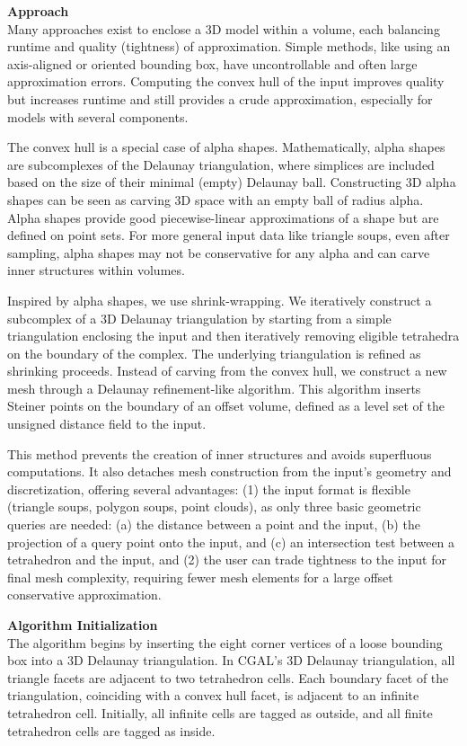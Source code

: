 \documentclass[12pt]{article}
\begin{document}
\textbf{Approach}\\
Many approaches exist to enclose a 3D model within a volume, each balancing runtime
and quality (tightness) of approximation. Simple methods, like using an axis-aligned
or oriented bounding box, have uncontrollable and often large approximation errors.
Computing the convex hull of the input improves quality but increases runtime and
still provides a crude approximation, especially for models with several components.

The convex hull is a special case of alpha shapes. Mathematically, alpha shapes are
subcomplexes of the Delaunay triangulation, where simplices are included based on the
size of their minimal (empty) Delaunay ball. Constructing 3D alpha shapes can be seen
as carving 3D space with an empty ball of radius alpha. Alpha shapes provide good
piecewise-linear approximations of a shape but are defined on point sets. For more
general input data like triangle soups, even after sampling, alpha shapes may not be
conservative for any alpha and can carve inner structures within volumes.

Inspired by alpha shapes, we use shrink-wrapping. We iteratively construct a subcomplex
of a 3D Delaunay triangulation by starting from a simple triangulation enclosing the
input and then iteratively removing eligible tetrahedra on the boundary of the complex.
The underlying triangulation is refined as shrinking proceeds. Instead of carving from
the convex hull, we construct a new mesh through a Delaunay refinement-like algorithm.
This algorithm inserts Steiner points on the boundary of an offset volume, defined as
a level set of the unsigned distance field to the input.

This method prevents the creation of inner structures and avoids superfluous
computations. It also detaches mesh construction from the input's geometry and
discretization, offering several advantages: (1) the input format is flexible (triangle
soups, polygon soups, point clouds), as only three basic geometric queries are needed:
(a) the distance between a point and the input, (b) the projection of a query point
onto the input, and (c) an intersection test between a tetrahedron and the input, and
(2) the user can trade tightness to the input for final mesh complexity, requiring
fewer mesh elements for a large offset conservative approximation.

\textbf{Algorithm Initialization}\\
The algorithm begins by inserting the eight corner vertices of a loose bounding box
into a 3D Delaunay triangulation. In CGAL's 3D Delaunay triangulation, all triangle
facets are adjacent to two tetrahedron cells. Each boundary facet of the triangulation,
coinciding with a convex hull facet, is adjacent to an infinite tetrahedron cell.
Initially, all infinite cells are tagged as outside, and all finite tetrahedron cells
are tagged as inside.
\end{document}
